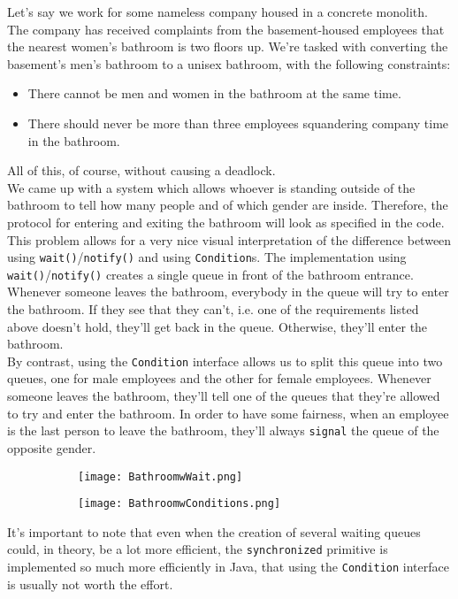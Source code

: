 \documentclass[main]{subfiles}
\begin{document}
\begin{example}
    Let's say we work for some nameless company housed in a concrete monolith. The company has received complaints from the basement-housed employees that the nearest women's bathroom is two floors up. We're tasked with converting the basement's men's bathroom to a unisex bathroom, with the following constraints:
    \begin{itemize}
        \item There cannot be men and women in the bathroom at the same time.
        \item There should never be more than three employees squandering company time in the bathroom.
    \end{itemize}
    All of this, of course, without causing a deadlock.\\
    We came up with a system which allows whoever is standing outside of the bathroom to tell how many people and of which gender are inside. Therefore, the protocol for entering and exiting the bathroom will look as specified in the code.\\[3mm]
    This problem allows for a very nice visual interpretation of the difference between using \texttt{wait()}/\texttt{notify()} and using \texttt{Condition}s. The implementation using \texttt{wait()}/\texttt{notify()} creates a single queue in front of the bathroom entrance. Whenever someone leaves the bathroom, everybody in the queue will try to enter the bathroom. If they see that they can't, i.e. one of the requirements listed above doesn't hold, they'll get back in the queue. Otherwise, they'll enter the bathroom.\\[3mm]
    By contrast, using the \texttt{Condition} interface allows us to split this queue into two queues, one for male employees and the other for female employees. Whenever someone leaves the bathroom, they'll tell one of the queues that they're allowed to try and enter the bathroom. In order to have some fairness, when an employee is the last person to leave the bathroom, they'll always \texttt{signal} the queue of the opposite gender.
    \begin{figure}[H]
        \centering
        \begin{subfigure}{.5\textwidth}
            \centering
            \texttt{[image: BathroomwWait.png]}
        \end{subfigure}%
        \begin{subfigure}{.5\textwidth}
            \centering
            \texttt{[image: BathroomwConditions.png]}
        \end{subfigure}
    \end{figure}
\end{example}
It's important to note that even when the creation of several waiting queues could, in theory, be a lot more efficient, the \texttt{synchronized} primitive is implemented so much more efficiently in Java, that using the \texttt{Condition} interface is usually not worth the effort.
\end{document}
